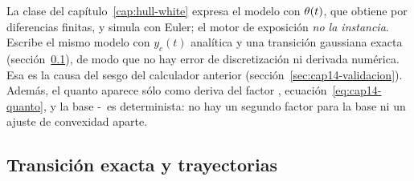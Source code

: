 \begin{sloppypar}
\begin{diferencia}
  La clase  del capítulo~\ref{cap:hull-white} expresa el modelo con
  $\theta(t)$, que obtiene por diferencias finitas, y simula con Euler; el motor de exposición \emph{no la instancia}.
  Escribe el mismo modelo con $y_c(t)$ analítica y una transición gaussiana exacta
  (sección~\ref{sec:cap14-paso}), de modo que no hay error de discretización ni derivada numérica. Esa es la causa
  del sesgo del calculador anterior (sección~\ref{sec:cap14-validacion}). Además, el quanto aparece sólo como deriva
  del factor \USD, ecuación~\eqref{eq:cap14-quanto}, y la base \MXN-\USD\ es determinista: no hay un segundo factor para
  la base ni un ajuste de convexidad aparte.
\end{diferencia}

\subsection{Transición exacta y trayectorias}\label{sec:cap14-paso}


\end{sloppypar}

